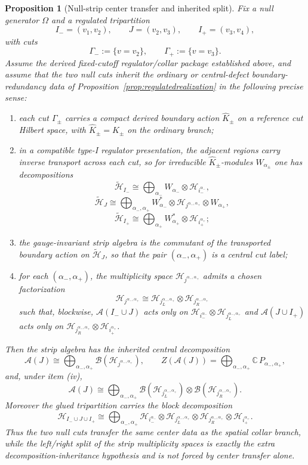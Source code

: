 \documentclass[11pt]{article}
\newtheorem{proposition}[theorem]{Proposition}
\begin{document}
\begin{proposition}[Null-strip center transfer and inherited split]\label{prop:nullec}
Fix a null generator \(\Omega\) and a regulated tripartition
\[
I_-=(v_1,v_2),\qquad
J=(v_2,v_3),\qquad
I_+=(v_3,v_4),
\]
with cuts
\[
\Gamma_-:=\{v=v_2\},
\qquad
\Gamma_+:=\{v=v_3\}.
\]
Assume the derived fixed-cutoff regulator/collar package established above, and assume that the two null cuts inherit the ordinary or central-defect boundary-redundancy data of Proposition~\ref{prop:regulatedrealization} in the following precise sense:
\begin{enumerate}[leftmargin=2em,label=(\roman*)]
\item each cut \(\Gamma_\pm\) carries a compact derived boundary action \(\widehat K_\pm\) on a reference cut Hilbert space, with \(\widehat K_\pm=K_\pm\) on the ordinary branch;
\item in a compatible type-I regulator presentation, the adjacent regions carry inverse transport across each cut, so for irreducible \(\widehat K_\pm\)-modules \(W_{\alpha_\pm}\) one has decompositions
\[
\tilde{\mathcal H}_{I_-}
\cong
\bigoplus_{\alpha_-}
W_{\alpha_-}\otimes \mathcal H_{i_-^{\alpha_-}},
\]
\[
\tilde{\mathcal H}_{J}
\cong
\bigoplus_{\alpha_-,\alpha_+}
W_{\alpha_-}^{*}\otimes
\mathcal H_{j^{\alpha_-,\alpha_+}}\otimes
W_{\alpha_+},
\]
\[
\tilde{\mathcal H}_{I_+}
\cong
\bigoplus_{\alpha_+}
W_{\alpha_+}^{*}\otimes \mathcal H_{i_+^{\alpha_+}};
\]
\item the gauge-invariant strip algebra is the commutant of the transported boundary action on \(\tilde{\mathcal H}_J\), so that the pair \((\alpha_-,\alpha_+)\) is a central cut label;
\item for each \((\alpha_-,\alpha_+)\), the multiplicity space \(\mathcal H_{j^{\alpha_-,\alpha_+}}\) admits a chosen factorization
\[
\mathcal H_{j^{\alpha_-,\alpha_+}}
\cong
\mathcal H_{j_L^{\alpha_-,\alpha_+}}\otimes
\mathcal H_{j_R^{\alpha_-,\alpha_+}}
\]
such that, blockwise, \(\mathcal A(I_-\cup J)\) acts only on
\(\mathcal H_{i_-^{\alpha_-}}\otimes \mathcal H_{j_L^{\alpha_-,\alpha_+}}\)
and \(\mathcal A(J\cup I_+)\) acts only on
\(\mathcal H_{j_R^{\alpha_-,\alpha_+}}\otimes \mathcal H_{i_+^{\alpha_+}}\).
\end{enumerate}
Then the strip algebra has the inherited central decomposition
\[
\mathcal A(J)
\cong
\bigoplus_{\alpha_-,\alpha_+}
\mathcal B(\mathcal H_{j^{\alpha_-,\alpha_+}}),
\qquad
Z(\mathcal A(J))
=
\bigoplus_{\alpha_-,\alpha_+}\mathbb C\,P_{\alpha_-,\alpha_+},
\]
and, under item (iv),
\[
\mathcal A(J)
\cong
\bigoplus_{\alpha_-,\alpha_+}
\mathcal B(\mathcal H_{j_L^{\alpha_-,\alpha_+}})
\otimes
\mathcal B(\mathcal H_{j_R^{\alpha_-,\alpha_+}}).
\]
Moreover the glued tripartition carries the block decomposition
\[
\mathcal H_{I_-\cup J\cup I_+}
\cong
\bigoplus_{\alpha_-,\alpha_+}
\mathcal H_{i_-^{\alpha_-}}
\otimes
\mathcal H_{j_L^{\alpha_-,\alpha_+}}
\otimes
\mathcal H_{j_R^{\alpha_-,\alpha_+}}
\otimes
\mathcal H_{i_+^{\alpha_+}}.
\]
Thus the two null cuts transfer the same center data as the spatial collar branch, while the left/right split of the strip multiplicity spaces is exactly the extra decomposition-inheritance hypothesis and is not forced by center transfer alone.
\end{proposition}
\end{document}
